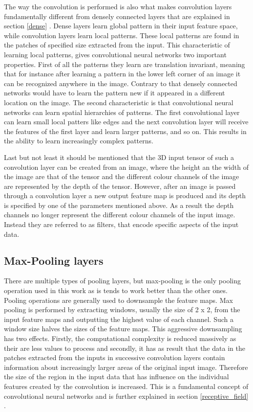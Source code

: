 The way the convolution is performed is also what makes convolution layers fundamentally different from densely connected layers that are explained in section \ref{dense} . Dense layers learn global pattern in their input feature space, while convolution layers learn local patterns. These local patterns are found in the patches of specified size extracted from the input. This characteristic of learning local patterns, gives convolutional neural networks two important properties. First of all the patterns they learn are translation invariant, meaning that for instance after learning a pattern in the lower left corner of an image it can be recognized anywhere in the image. Contrary to that densely connected networks would have to learn the pattern new if it appeared in a different location on the image. The second characteristic is that convolutional neural networks can learn spatial hierarchies of patterns. The first convolutional layer can learn small local patters like edges and the next convolution layer will receive the features of the first layer and learn larger patterns, and so on. This results in the ability to learn increasingly complex patterns.

Last but not least it should be mentioned that the 3D input tensor of such a convolution layer can be created from an image, where the height an the width of the image are that of the tensor and the different colour channels of the image are represented by the depth of the tensor. However, after an image is passed through a convolution layer a new output feature map is produced and its depth is specified by one of the parameters mentioned above. As a result the depth channels no longer represent the different colour channels of the input image. Instead they are referred to as filters, that encode specific aspects of the input data. 

\subsection{Max-Pooling layers} 
\label{max_pooling}
There are multiple types of pooling layers, but max-pooling is the only pooling operation used in this work as is tends to work better than the other ones. Pooling operations are generally used to downsample the feature maps. Max pooling is performed by extracting windows, usually the size of 2 x 2, from the input feature maps and outputting the highest value of each channel. Such a window size halves the sizes of the feature maps. This aggressive downsampling has two effects. Firstly, the computational complexity is reduced massively as their are less values to process and secondly, it has as result that the data in the patches extracted from the inputs in successive convolution layers contain information about increasingly larger areas of the original input image. Therefore the size of the region in the input data that has influence on the individual features created by the convolution is increased.  This is a fundamental concept of convolutional neural networks and is further explained in section \ref{receptive_field} .


